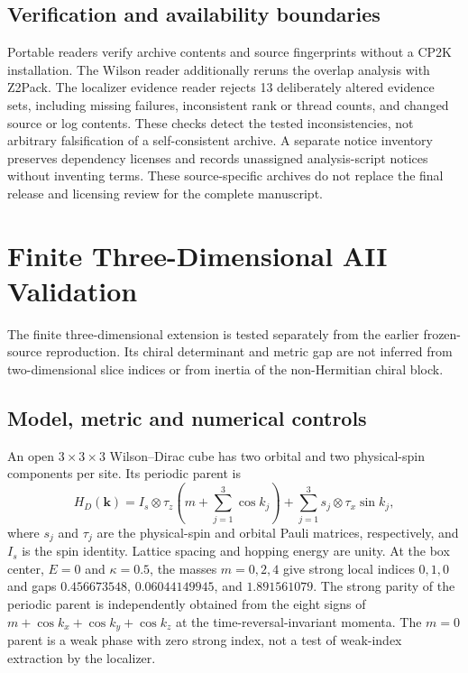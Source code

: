 \documentclass[11pt]{article}
\begin{document}
\subsection{Verification and availability boundaries}
Portable readers verify archive contents and source fingerprints
without a CP2K installation. The Wilson reader additionally reruns
the overlap analysis with Z2Pack. The localizer evidence reader
rejects 13 deliberately altered evidence sets, including missing
failures, inconsistent rank or thread counts, and changed source or
log contents. These checks detect the tested inconsistencies, not
arbitrary falsification of a self-consistent archive.
A separate notice inventory preserves dependency licenses and
records unassigned analysis-script notices without inventing terms.
These source-specific archives do not replace the final release and
licensing review for the complete manuscript.

\section{Finite Three-Dimensional AII Validation}
\label{sec:si-finite-three-dimensional}
The finite three-dimensional extension is tested separately from
the earlier frozen-source reproduction. Its chiral determinant
and metric gap are not inferred from two-dimensional slice
indices or from inertia of the non-Hermitian chiral block.

\subsection{Model, metric and numerical controls}
An open $3\times3\times3$ Wilson--Dirac cube has two orbital
and two physical-spin components per site. Its periodic parent is
\begin{equation}
 H_D(\bm k)=I_s\otimes\tau_z
       \left(m+\sum_{j=1}^3\cos k_j\right)
       +\sum_{j=1}^3 s_j\otimes\tau_x\sin k_j ,
\end{equation}
where $s_j$ and $\tau_j$ are the physical-spin and orbital
Pauli matrices, respectively, and $I_s$ is the spin identity.
Lattice spacing and hopping energy are unity.
At the box center, $E=0$ and $\kappa=0.5$, the masses
$m=0,2,4$ give strong local indices $0,1,0$ and gaps
$0.456673548$, $0.06044149945$, and $1.891561079$.
The strong parity of the periodic parent is independently
obtained from the eight signs of
$m+\cos k_x+\cos k_y+\cos k_z$ at the time-reversal-invariant
momenta. The $m=0$ parent is a weak phase with zero strong
index, not a test of weak-index extraction by the localizer.
\end{document}
